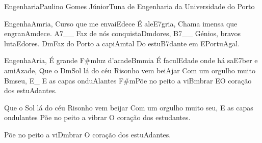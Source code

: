 \begin{musica}{Engenharia}{Paulino Gomes Júnior}{Tuna de Engenharia da Universidade do Porto}

Engenha\ac{Am}{ria},
Curso que me envai\ac{E}{de}ce
É ale\ac{E7}{gria},
Chama imensa que engran\ac{Am}{de}ce. \ac{A7}{}__
Faz de nós conquista\ac{Dm}{do}res, \ac{B7}{}__
Génios, bravos luta\ac{E}{do}res.
\ac{Dm}{Faz} do Porto a capi\ac{Am}{tal}
Do estu\ac{B7}{dan}te em \ac{E}{Por}tu\ac{A}{gal}.

Engenha\ac{A}{ria},
É grande \ac{F#m}{luz} d’acade\ac{Bm}{mia}
É facul\ac{E}{da}de onde há sa\ac{E7}{ber} e ami\ac{A}{za}de,
Que o \ac{Dm}{Sol} lá do céu
Risonho vem bei\ac{A}{jar}
Com um orgulho muito \ac{Bm}{seu}, \ac{E}{}_
E as capas ondu\ac{A}{lan}tes
\ac{F#m}{Põe} no peito a vi\ac{Bm}{brar}
\ac{E}{O} coração dos estu\ac{A}{dan}tes.


Que o Sol lá do céu Risonho vem beijar
Com um orgulho muito seu, E as capas ondulantes
Põe no peito a vibrar
O coração dos estudantes.

Põe no peito a vi\ac{Dm}{brar}
O coração dos estu\ac{A}{dan}tes.

\end{musica}
